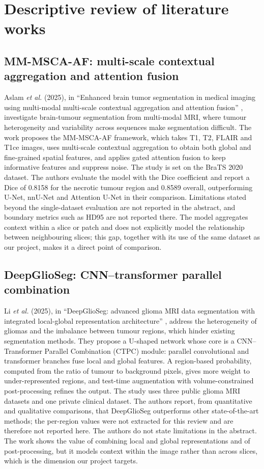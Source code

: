 \section{Descriptive review of literature works}

\subsection{MM-MSCA-AF: multi-scale contextual aggregation and attention fusion}
Aslam \emph{et al.} (2025), in ``Enhanced brain tumor segmentation in medical imaging using multi-modal multi-scale contextual aggregation and attention fusion'' \cite{aslam2025}, investigate brain-tumour segmentation from multi-modal MRI, where tumour heterogeneity and variability across sequences make segmentation difficult. The work proposes the MM-MSCA-AF framework, which takes T1, T2, FLAIR and T1ce images, uses multi-scale contextual aggregation to obtain both global and fine-grained spatial features, and applies gated attention fusion to keep informative features and suppress noise. The study is set on the BraTS 2020 dataset. The authors evaluate the model with the Dice coefficient and report a Dice of 0.8158 for the necrotic tumour region and 0.8589 overall, outperforming U-Net, nnU-Net and Attention U-Net in their comparison. Limitations stated beyond the single-dataset evaluation are not reported in the abstract, and boundary metrics such as HD95 are not reported there. The model aggregates context within a slice or patch and does not explicitly model the relationship between neighbouring slices; this gap, together with its use of the same dataset as our project, makes it a direct point of comparison.

\subsection{DeepGlioSeg: CNN--transformer parallel combination}
Li \emph{et al.} (2025), in ``DeepGlioSeg: advanced glioma MRI data segmentation with integrated local-global representation architecture'' \cite{li2025deepglioseg}, address the heterogeneity of gliomas and the imbalance between tumour regions, which hinder existing segmentation methods. They propose a U-shaped network whose core is a CNN--Transformer Parallel Combination (CTPC) module: parallel convolutional and transformer branches fuse local and global features. A region-based probability, computed from the ratio of tumour to background pixels, gives more weight to under-represented regions, and test-time augmentation with volume-constrained post-processing refines the output. The study uses three public glioma MRI datasets and one private clinical dataset. The authors report, from quantitative and qualitative comparisons, that DeepGlioSeg outperforms other state-of-the-art methods; the per-region values were not extracted for this review and are therefore not reported here. The authors do not state limitations in the abstract. The work shows the value of combining local and global representations and of post-processing, but it models context within the image rather than across slices, which is the dimension our project targets.

